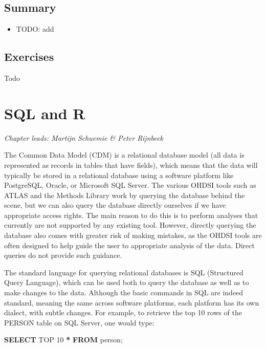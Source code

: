\documentclass[11pt]{book}
\newenvironment{Shaded}{\begin{snugshade}}{\end{snugshade}}
\newcommand{\DecValTok}[1]{\textcolor[rgb]{0.00,0.00,0.81}{#1}}
\newcommand{\KeywordTok}[1]{\textcolor[rgb]{0.13,0.29,0.53}{\textbf{#1}}}
\newcommand{\NormalTok}[1]{#1}
\newcommand{\OperatorTok}[1]{\textcolor[rgb]{0.81,0.36,0.00}{\textbf{#1}}}
\providecommand{\tightlist}{%
  \setlength{\itemsep}{0pt}\setlength{\parskip}{0pt}}
\theoremstyle{definition}
\theoremstyle{definition}
\theoremstyle{definition}
\theoremstyle{remark}
\let\BeginKnitrBlock\begin \let\EndKnitrBlock\end
\begin{document}
\hypertarget{summary-5}{%
\section{Summary}\label{summary-5}}

\BeginKnitrBlock{rmdsummary}
\begin{itemize}
\tightlist
\item
  TODO: add
\end{itemize}
\EndKnitrBlock{rmdsummary}

\hypertarget{exercises}{%
\section{Exercises}\label{exercises}}

Todo

\hypertarget{SqlAndR}{%
\chapter{SQL and R}\label{SqlAndR}}

\emph{Chapter leads: Martijn Schuemie \& Peter Rijnbeek}

The Common Data Model (CDM) is a relational database model (all data is represented as records in tables that have fields), which means that the data will typically be stored in a relational database using a software platform like PostgreSQL, Oracle, or Microsoft SQL Server. The various OHDSI tools such as ATLAS and the Methods Library work by querying the database behind the scene, but we can also query the database directly ourselves if we have appropriate access rights. The main reason to do this is to perform analyses that currently are not supported by any existing tool. However, directly querying the database also comes with greater risk of making mistakes, as the OHDSI tools are often designed to help guide the user to appropriate analysis of the data. Direct queries do not provide such guidance.

The standard language for querying relational databases is SQL (Structured Query Language), which can be used both to query the database as well as to make changes to the data. Although the basic commands in SQL are indeed standard, meaning the same across software platforms, each platform has its own dialect, with subtle changes. For example, to retrieve the top 10 rows of the PERSON table on SQL Server, one would type:

\begin{Shaded}
\begin{Highlighting}[]
\KeywordTok{SELECT}\NormalTok{ TOP }\DecValTok{10} \OperatorTok{*} \KeywordTok{FROM}\NormalTok{ person;}
\end{Highlighting}
\end{Shaded}
\end{document}
